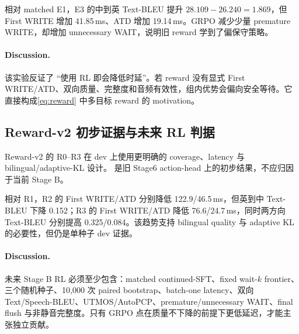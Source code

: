 \documentclass[11pt,a4paper]{article}
\begin{document}
相对 matched E1，E3 的中到英 Text-BLEU 提升 $28.109-26.240=1.869$，但 First WRITE 增加 41.85\,ms、ATD 增加 19.14\,ms。GRPO 减少少量 premature WRITE，却增加 unnecessary WAIT，说明旧 reward 学到了偏保守策略。

\paragraph{Discussion.}
该实验反证了 ``使用 RL 即会降低时延''。若 reward 没有显式 First WRITE/ATD、双向质量、完整度和音频有效性，组内优势会偏向安全等待。它直接构成\cref{eq:reward} 中多目标 reward 的 motivation。

\subsection{Reward-v2 初步证据与未来 RL 判据}

Reward-v2 的 R0--R3 在 dev 上使用更明确的 coverage、latency 与 bilingual/adaptive-KL 设计。 是旧 Stage6 action-head 上的初步结果，不应归因于当前 Stage B。

\begin{table}[H]
\centering
\caption{Reward-v2 dev 结果。R1 是 matched rebalanced+coverage control。}
\label{tab:rewardv2}
\end{table}

相对 R1，R2 的 First WRITE/ATD 分别降低 122.9/46.5\,ms，但英到中 Text-BLEU 下降 0.152；R3 的 First WRITE/ATD 降低 76.6/24.7\,ms，同时两方向 Text-BLEU 分别提高 0.325/0.084。该趋势支持 bilingual quality 与 adaptive KL 的必要性，但仍是单种子 dev 证据。

\paragraph{Discussion.}
未来 Stage B RL 必须至少包含：matched continued-SFT、fixed wait-$k$ frontier、三个随机种子、10,000 次 paired bootstrap、batch-one latency、双向 Text/Speech-BLEU、UTMOS/AutoPCP、premature/unnecessary WAIT、final flush 与非静音完整度。只有 GRPO 点在质量不下降的前提下更低延迟，才能主张独立贡献。
\end{document}
